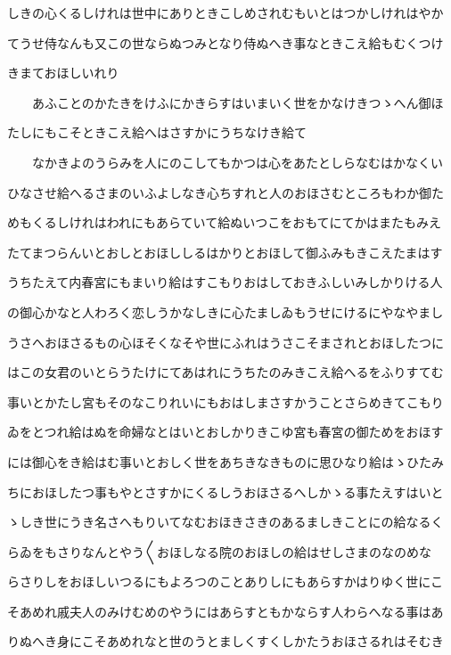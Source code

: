 \documentclass[a4paper,11pt,landscape]{ltjtarticle}
\begin{document}
\par\medskip
しきの心くるしけれは世中にありときこしめされむもいとはつかしけれはやか
\par\medskip
てうせ侍なんも又この世ならぬつみとなり侍ぬへき事なときこえ給もむくつけ
\par\medskip
きまておほしいれり
\par\medskip
　　あふことのかたきをけふにかきらすはいまいく世をかなけきつゝへん御ほ
\par\medskip
たしにもこそときこえ給へはさすかにうちなけき給て
\par\medskip
　　なかきよのうらみを人にのこしてもかつは心をあたとしらなむはかなくい
\par\medskip
ひなさせ給へるさまのいふよしなき心ちすれと人のおほさむところもわか御た
\par\medskip
めもくるしけれはわれにもあらていて給ぬいつこをおもてにてかはまたもみえ
\par\medskip
たてまつらんいとおしとおほししるはかりとおほして御ふみもきこえたまはす
\par\medskip
うちたえて内春宮にもまいり給はすこもりおはしておきふしいみしかりける人
\par\medskip
の御心かなと人わろく恋しうかなしきに心たましゐもうせにけるにやなやまし
\par\medskip
うさへおほさるもの心ほそくなそや世にふれはうさこそまされとおほしたつに
\par\medskip
はこの女君のいとらうたけにてあはれにうちたのみきこえ給へるをふりすてむ
\par\medskip
事いとかたし宮もそのなこりれいにもおはしまさすかうことさらめきてこもり
\par\medskip
ゐをとつれ給はぬを命婦なとはいとおしかりきこゆ宮も春宮の御ためをおほす
\par\medskip
には御心をき給はむ事いとおしく世をあちきなきものに思ひなり給はゝひたみ
\par\medskip
ちにおほしたつ事もやとさすかにくるしうおほさるへしかゝる事たえすはいと
\par\medskip
ゝしき世にうき名さへもりいてなむおほきさきのあるましきことにの給なるく
\par\medskip
らゐをもさりなんとやう〱おほしなる院のおほしの給はせしさまのなのめな
\par\medskip
らさりしをおほしいつるにもよろつのことありしにもあらすかはりゆく世にこ
\par\medskip
そあめれ戚夫人のみけむめのやうにはあらすともかならす人わらへなる事はあ
\par\medskip
りぬへき身にこそあめれなと世のうとましくすくしかたうおほさるれはそむき
\end{document}
